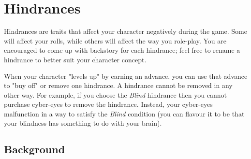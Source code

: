 \section{Hindrances}

Hindrances are traits that affect your character negatively during the game. Some will affect your rolls, while others will affect the way you role-play. You are encouraged to come up with backstory for each hindrance; feel free to rename a hindrance to better suit your character concept.

When your character "levels up" by earning an advance, you can use that advance to "buy off" or remove one hindrance. A hindrance cannot be removed in any other way. For example, if you choose the \textit{Blind} hindrance then you cannot purchase cyber-eyes to remove the hindrance. Instead, your cyber-eyes malfunction in a way to satisfy the \textit{Blind} condition (you can flavour it to be that your blindness has something to do with your brain).

\subsection{Background}


